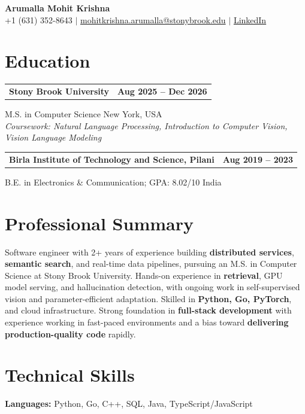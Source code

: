\documentclass[letterpaper,10pt]{article}
\makeatletter
\newcommand{\entry}[2]{%
  \noindent
  \begin{tabularx}{\linewidth}
    {@{}>{\raggedright\arraybackslash}X@{\hspace{6pt}}r@{}}
    \textbf{#1} & #2
  \end{tabularx}\par
}
\makeatother
\begin{document}
\begin{center}
    {\LARGE\bfseries Arumalla Mohit Krishna}\\[3pt]
    +1 (631) 352-8643 $|$
    \href{mailto:mohitkrishna.arumalla@stonybrook.edu}
    {mohitkrishna.arumalla@stonybrook.edu} $|$
    \href{https://linkedin.com/in/mohit-krishna-arumalla}
    {LinkedIn}
\end{center}
\vspace{-8pt}

\section{Education}

\entry
  {\textbf{Stony Brook University}}
  {\textbf{Aug 2025 -- Dec 2026}}

M.S. in Computer Science \hfill New York, USA\\
\textit{
Coursework: Natural Language Processing,
Introduction to Computer Vision, Vision Language Modeling
}
\vspace{3pt}

\entry
  {\textbf{Birla Institute of Technology and Science, Pilani}}
  {\textbf{Aug 2019 -- 2023}}

B.E. in Electronics \& Communication; GPA: 8.02/10 \hfill India
\section{Professional Summary}

Software engineer with 2+ years of experience building \textbf{distributed services}, \textbf{semantic search}, and real-time data pipelines, pursuing an M.S. in Computer Science at Stony Brook University. Hands-on experience in \textbf{retrieval}, GPU model serving, and hallucination detection, with ongoing work in self-supervised vision and parameter-efficient adaptation. Skilled in \textbf{Python, Go, PyTorch}, and cloud infrastructure. Strong foundation in \textbf{full-stack development} with experience working in fast-paced environments and a bias toward \textbf{delivering production-quality code} rapidly.

\section{Technical Skills}

\textbf{Languages:}
Python, Go, C++, SQL, Java, TypeScript/JavaScript\\
\end{document}
